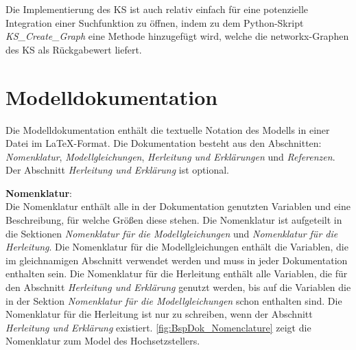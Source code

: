 Die Implementierung des KS ist auch relativ einfach für eine potenzielle Integration einer Suchfunktion zu öffnen, indem zu dem Python-Skript \textit{KS\_Create\_Graph} eine Methode hinzugefügt wird, welche die networkx-Graphen des KS als Rückgabewert liefert.  

\section{Modelldokumentation}
\label{Ch:Ergebnisse:Sec:Dokumentation}
Die Modelldokumentation enthält die textuelle Notation des Modells in einer Datei im \LaTeX-Format. Die Dokumentation besteht aus den Abschnitten: \textit{Nomenklatur}, \textit{Modellgleichungen}, \textit{Herleitung und Erklärungen} und \textit{Referenzen}. Der Abschnitt \textit{Herleitung und Erklärung} ist optional.

\textbf{Nomenklatur}:\\
Die Nomenklatur enthält alle in der Dokumentation genutzten Variablen und eine Beschreibung, für welche Größen diese stehen. Die Nomenklatur ist aufgeteilt in die Sektionen \textit{Nomenklatur für die Modellgleichungen} und \textit{Nomenklatur für die Herleitung}. Die Nomenklatur für die Modellgleichungen enthält die Variablen, die im gleichnamigen Abschnitt verwendet werden und muss in jeder Dokumentation enthalten sein. Die Nomenklatur für die Herleitung enthält alle Variablen, die für den Abschnitt \textit{Herleitung und Erklärung} genutzt werden, bis auf die Variablen die in der Sektion \textit{Nomenklatur für die Modellgleichungen} schon enthalten sind. Die Nomenklatur für die Herleitung ist nur zu schreiben, wenn der Abschnitt \textit{Herleitung und Erklärung} existiert. \autoref{fig:BspDok_Nomenclature} zeigt die Nomenklatur zum Model des Hochsetzstellers.


